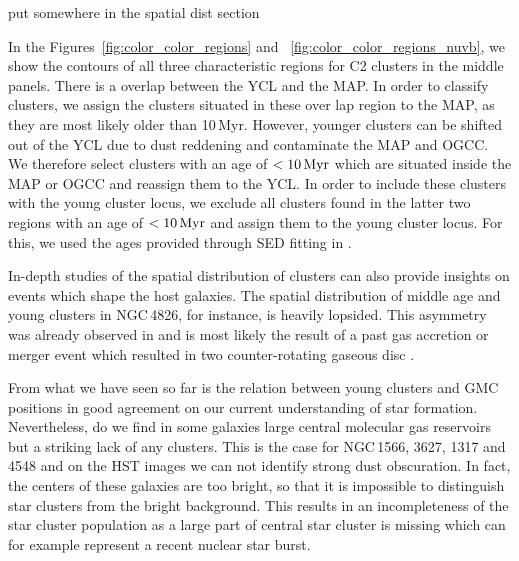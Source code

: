 put somewhere in the spatial dist section

In the Figures~\ref{fig:color_color_regions} and ~\ref{fig:color_color_regions_nuvb}, we show the contours of all three characteristic regions for C2 clusters in the middle panels. There is a overlap between the YCL and the MAP. In order to classify clusters, we assign the clusters situated in these over lap region to the MAP, as they are most likely older than 10\,Myr. However, younger clusters can be shifted out of the YCL due to dust reddening and contaminate the MAP and OGCC. We therefore select clusters with an age of $< 10\,{\rm Myr}$ which are situated inside the MAP or OGCC and reassign them to the YCL. 
In order to include these clusters with the young cluster locus, we exclude all clusters found in the latter two regions with an age of $< 10\,{\rm Myr}$ and assign them to the young cluster locus. For this, we used the ages provided through SED fitting in \citet{thilker23sed}.

In-depth studies of the spatial distribution of clusters can also provide insights on events which shape the host galaxies. The spatial distribution of middle age and young clusters in NGC\,4826, for instance, is heavily lopsided. This asymmetry was already observed in \citet{garcia-burillo_molecular_2003} and is most likely the result of a past gas accretion or merger event which resulted in two counter-rotating gaseous disc \citep{braun_counter-rotating_1992,rix_placid_1995}.

From what we have seen so far is the relation between young clusters and GMC positions in good agreement on our current understanding of star formation. Nevertheless, do we find in some galaxies large central molecular gas reservoirs but a striking lack of any clusters. This is the case for NGC\,1566, 3627, 1317 and 4548 and on the HST images we can not identify strong dust obscuration. In fact, the centers of these galaxies are too bright, so that it is impossible to distinguish star clusters from the bright background. This results in an incompleteness of the star cluster population as a large part of central star cluster is missing which can for example represent a recent nuclear star burst.  
 